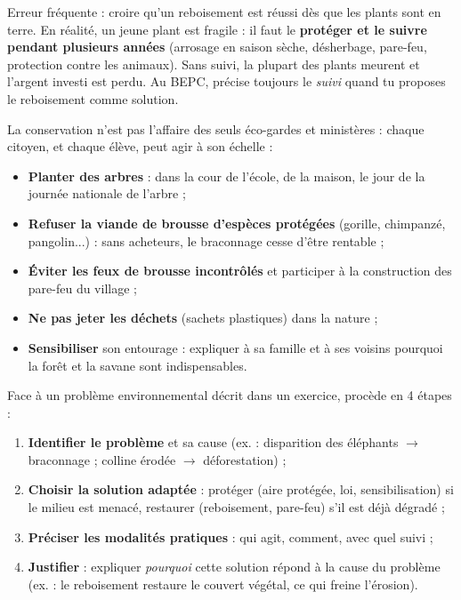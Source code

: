 \documentclass[11pt]{article}
\newcounter{popsec}
\newcounter{popsub}
\newcommand{\courssub}[1]{%
  \stepcounter{popsub}%
  \par\vspace{9pt}\noindent{\popxbold\fontsize{11.5}{13}\selectfont\color{popink}{\color{poporange}\thepopsec.\thepopsub}\hspace{6pt}#1}\par\nopagebreak\vspace{4pt}
}
\begin{document}
\begin{attention}
Erreur fréquente : croire qu'un reboisement est réussi dès que les plants sont en terre. En réalité, un jeune plant est fragile : il faut le \textbf{protéger et le suivre pendant plusieurs années} (arrosage en saison sèche, désherbage, pare-feu, protection contre les animaux). Sans suivi, la plupart des plants meurent et l'argent investi est perdu. Au BEPC, précise toujours le \emph{suivi} quand tu proposes le reboisement comme solution.
\end{attention}

\courssub{Le rôle du citoyen et de l'élève}

La conservation n'est pas l'affaire des seuls éco-gardes et ministères : chaque citoyen, et chaque élève, peut agir à son échelle :

\begin{itemize}
\item \textbf{Planter des arbres} : dans la cour de l'école, de la maison, le jour de la journée nationale de l'arbre ;
\item \textbf{Refuser la viande de brousse d'espèces protégées} (gorille, chimpanzé, pangolin...) : sans acheteurs, le braconnage cesse d'être rentable ;
\item \textbf{Éviter les feux de brousse incontrôlés} et participer à la construction des pare-feu du village ;
\item \textbf{Ne pas jeter les déchets} (sachets plastiques) dans la nature ;
\item \textbf{Sensibiliser} son entourage : expliquer à sa famille et à ses voisins pourquoi la forêt et la savane sont indispensables.
\end{itemize}

\begin{methode}
Face à un problème environnemental décrit dans un exercice, procède en 4 étapes :
\begin{enumerate}
\item \textbf{Identifier le problème} et sa cause (ex. : disparition des éléphants $\rightarrow$ braconnage ; colline érodée $\rightarrow$ déforestation) ;
\item \textbf{Choisir la solution adaptée} : protéger (aire protégée, loi, sensibilisation) si le milieu est menacé, restaurer (reboisement, pare-feu) s'il est déjà dégradé ;
\item \textbf{Préciser les modalités pratiques} : qui agit, comment, avec quel suivi ;
\item \textbf{Justifier} : expliquer \emph{pourquoi} cette solution répond à la cause du problème (ex. : le reboisement restaure le couvert végétal, ce qui freine l'érosion).
\end{enumerate}
\end{methode}
\end{document}
